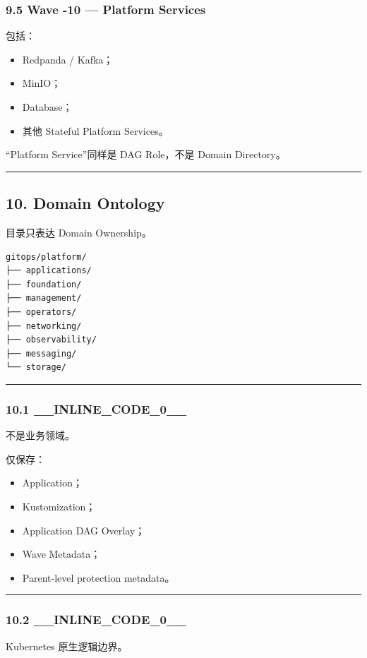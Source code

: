 \documentclass[11pt,a4paper]{article}
\begin{document}
\subsubsection{9.5 Wave -10 — Platform Services}
包括：

\begin{itemize}
  \item Redpanda / Kafka；
  \item MinIO；
  \item Database；
  \item 其他 Stateful Platform Services。
\end{itemize}
“Platform Service”同样是 DAG Role，不是 Domain Directory。

\vspace{0.5em}\hrule\vspace{0.5em}
\subsection{10. Domain Ontology}
目录只表达 Domain Ownership。

\begin{lstlisting}[language=text]
gitops/platform/
├── applications/
├── foundation/
├── management/
├── operators/
├── networking/
├── observability/
├── messaging/
└── storage/
\end{lstlisting}
\vspace{0.5em}\hrule\vspace{0.5em}
\subsubsection{10.1 \_\_INLINE\_CODE\_0\_\_}
不是业务领域。

仅保存：

\begin{itemize}
  \item Application；
  \item Kustomization；
  \item Application DAG Overlay；
  \item Wave Metadata；
  \item Parent-level protection metadata。
\end{itemize}
\vspace{0.5em}\hrule\vspace{0.5em}
\subsubsection{10.2 \_\_INLINE\_CODE\_0\_\_}
Kubernetes 原生逻辑边界。
\end{document}
